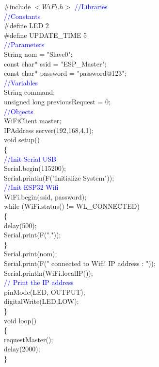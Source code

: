 \documentclass[12pt,a4paper]{article}
\begin{document}
\#include $<WiFi.h>$  \textcolor{blue}{//Libraries}\\
 \textcolor{blue}{//Constants}\\
\#define LED 2 \\
\#define UPDATE\_TIME 5\\
 \textcolor{blue}{//Parameters}\\
String nom = "Slave0";\\
const char* ssid = "ESP\_Master";\\
const char* password = "password@123";\\
 \textcolor{blue}{//Variables}\\
String command;\\
unsigned long previousRequest = 0;\\
 \textcolor{blue}{//Objects}\\
WiFiClient master;\\
IPAddress server(192,168,4,1);\\[15pt]

void setup()\\
 \{\\
 \textcolor{blue}{//Init Serial USB}\\
 Serial.begin(115200);\\
 Serial.println(F("Initialize System"));\\
 \textcolor{blue}{//Init ESP32 Wifi}\\
 WiFi.begin(ssid, password);\\
while (WiFi.status() != WL\_CONNECTED)\\ 
\{\\
   delay(500);\\
   Serial.print(F("."));\\
 \}\\
 Serial.print(nom);\\
 Serial.print(F(" connected to Wifi! IP address : "));\\
 Serial.println(WiFi.localIP());\\ \textcolor{blue}{// Print the IP address}\\
 pinMode(LED, OUTPUT);\\
 digitalWrite(LED,LOW);\\
\}\\[15pt]

void loop() \\
\{\\
   requestMaster();\\
   delay(2000);\\
\}\\[15pt]
\end{document}
